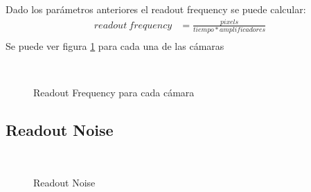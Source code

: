 \documentclass[a4paper,10pt]{article}
\begin{document}
Dado los parámetros anteriores el readout frequency se puede calcular: 
\begin{align*}
readout\ frequency &= \frac{pixels}{tiempo*amplificadores}\\
\end{align*}
Se puede ver figura \ref{fig:p3} para  cada una de las cámaras
\begin{figure}[ht!]
  \centering
  ~ 
  ~ 
  ~ 
  \caption{Readout Frequency para cada cámara}
  \label{fig:p3}
\end{figure}

\subsection{Readout Noise}
\begin{figure}[ht!]
  \centering
  ~ 
  \caption{Readout Noise}
  \label{fig:p3_a}
\end{figure}
\end{document}
